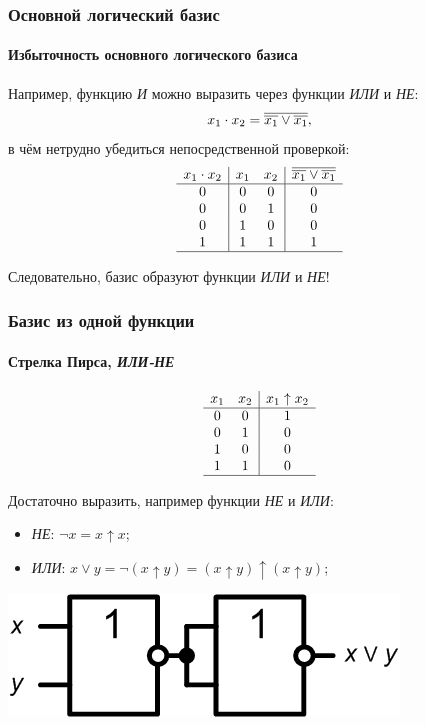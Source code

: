 \begin{frame}
    \frametitle{Основной логический базис}
    \framesubtitle{Избыточность основного логического базиса}
    
    Например, функцию \textit{И} можно выразить через функции \textit{ИЛИ} и \textit{НЕ}:
    \[x_1\cdot x_2 = \overline{\overline{x_1}\lor\overline{x_1}},\] 
    в чём нетрудно убедиться непосредственной проверкой:
    \[
        \begin{array}{c|cc|c}
            x_1\cdot x_2&x_1&x_2&\overline{\overline{x_1}\lor\overline{x_1}}\\
            \hline
            0&0&0&0\\
            0&0&1&0\\
            0&1&0&0\\
            1&1&1&1\\
            \hline
        \end{array}
    \]
    
    Следовательно, базис образуют функции \textit{ИЛИ} и \textit{НЕ}!
\end{frame}

\begin{frame}
    \frametitle{Базис из одной функции}
    \framesubtitle{Стрелка Пирса, \textit{ИЛИ-НЕ}}

    \[
        \begin{array}{cc|c}
            x_1&x_2&x_1\uparrow x_2\\
            \hline
            0&0&1\\
            0&1&0\\
            1&0&0\\
            1&1&0\\
            \hline
        \end{array}
    \]
    
    Достаточно выразить, например функции \textit{НЕ} и \textit{ИЛИ}:
    \begin{itemize}
        \item \textit{НЕ}: $\lnot x=x\uparrow x$;
        \item \textit{ИЛИ}: $x\lor y=\lnot(x\uparrow y)=(x\uparrow y)\uparrow(x\uparrow y)$;
    \end{itemize}

    \begin{center}
        \includegraphics[width=.45\textwidth]{fig/orByNotOr}
    \end{center}
\end{frame}



